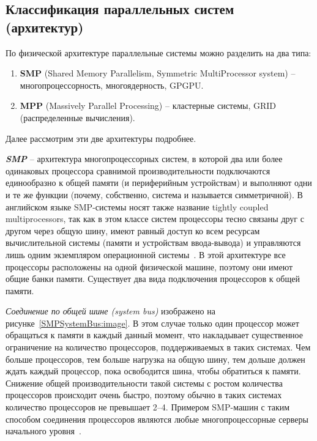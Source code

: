 \subsection{Классификация параллельных систем (архитектур)}

По физической архитектуре параллельные системы можно разделить на два типа:

\begin{enumerate}
    \item\textbf{SMP} (Shared Memory Parallelism, Symmetric MultiProcessor system) -- многопроцессорность, многоядерность, GPGPU\@. 
    \item\textbf{MPP} (Massively Parallel Processing) -- кластерные системы, GRID (распределенные вычисления).
\end{enumerate}

Далее рассмотрим эти две архитектуры подробнее.

\textbf{\textit{SMP}} -- архитектура многопроцессорных систем, в которой два или более одинаковых процессора сравнимой производительности подключаются единообразно к общей памяти (и периферийным устройствам) и выполняют одни и те же функции (почему, собственно, система и называется симметричной). В английском языке SMP-системы носят также название tightly coupled multiprocessors, так как в этом классе систем процессоры тесно связаны друг с другом через общую шину, имеют равный доступ ко всем ресурсам вычислительной системы (памяти и устройствам ввода-вывода) и управляются лишь одним экземпляром операционной системы~\cite{SymmetricMultiprocessingWP}. В этой архитектуре все процессоры расположены на одной физической машине, поэтому они имеют общие банки памяти. Существует два вида подключения процессоров к общей памяти.

\textit{Соединение по общей шине (system bus)} изображено на рисунке~\ref{SMPSystemBus:image}. В этом случае только один процессор может обращаться к памяти в каждый данный момент, что накладывает существенное ограничение на количество процессоров, поддерживаемых в таких системах. Чем больше процессоров, тем больше нагрузка на общую шину, тем дольше должен ждать каждый процессор, пока освободится шина, чтобы обратиться к памяти. Снижение общей производительности такой системы с ростом количества процессоров происходит очень быстро, поэтому обычно в таких системах количество процессоров не превышает 2--4. Примером SMP-машин с таким способом соединения процессоров являются любые многопроцессорные серверы начального уровня~\cite{Martyshkin2014}.

